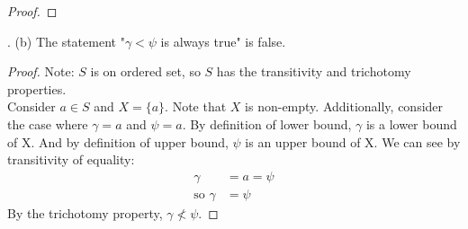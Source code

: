 \documentclass{amsart}
\begin{document}
\begin{enumerate}[1.]
\begin{proof}
\end{proof}.
(b) The statement "$\gamma<\psi$ is always true" is false.
\begin{proof}
Note: $S$ is on ordered set, so $S$ has the transitivity and trichotomy properties. \\
Consider $a\in S$ and $X = \{a\}$. Note that $X$ is non-empty.
Additionally, consider the case where $\gamma = a$ and $\psi = a$.
By definition of lower bound, $\gamma$ is a lower bound of X.
And by definition of upper bound, $\psi$ is an upper bound of X.
We can see by transitivity of equality:
\begin{align*}
    \gamma &= a = \psi \\
    \text{so } \gamma &= \psi
\end{align*}
By the trichotomy property, $ \gamma \nless \psi$.
\end{proof}

\end{enumerate}
\end{document}

